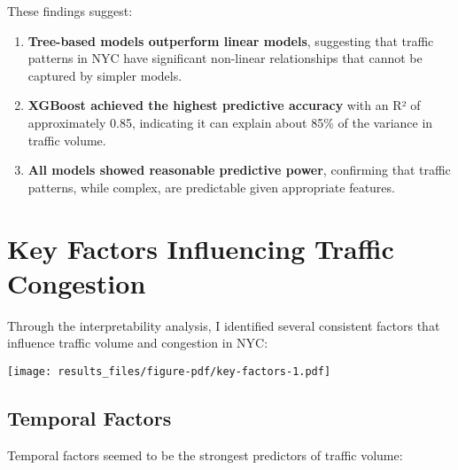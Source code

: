\documentclass[
  letterpaper,
  DIV=11,
  numbers=noendperiod]{scrreprt}
\begin{document}
These findings suggest:

\begin{enumerate}
\def\labelenumi{\arabic{enumi}.}
\item
  \textbf{Tree-based models outperform linear models}, suggesting that
  traffic patterns in NYC have significant non-linear relationships that
  cannot be captured by simpler models.
\item
  \textbf{XGBoost achieved the highest predictive accuracy} with an R²
  of approximately 0.85, indicating it can explain about 85\% of the
  variance in traffic volume.
\item
  \textbf{All models showed reasonable predictive power}, confirming
  that traffic patterns, while complex, are predictable given
  appropriate features.
\end{enumerate}

\section{Key Factors Influencing Traffic
Congestion}\label{key-factors-influencing-traffic-congestion}

Through the interpretability analysis, I identified several consistent
factors that influence traffic volume and congestion in NYC:

\texttt{[image: results\_files/figure-pdf/key-factors-1.pdf]}

\subsection{Temporal Factors}\label{temporal-factors}

Temporal factors seemed to be the strongest predictors of traffic
volume:
\end{document}
